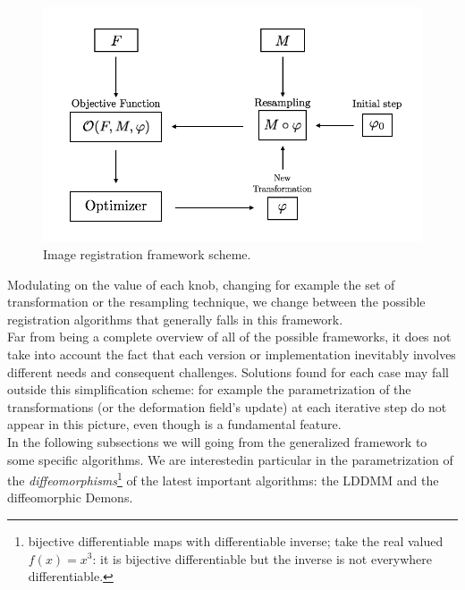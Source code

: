 \begin{figure}[!ht]
	\centering
	\includegraphics[scale=0.35]{figures/iterative_algorithm.png}
	\caption{Image registration framework scheme.}
	\label{fig:iterative_algorithm_scheme}
\end{figure}

\noindent
Modulating on the value of each knob, changing for example the set of transformation or the resampling technique, we change between the possible registration algorithms that generally falls in this framework.\\

%
\noindent
Far from being a complete overview of all of the possible frameworks, it does not take into account the fact that each version or implementation inevitably involves different needs and consequent challenges. Solutions found for each case may fall outside this simplification scheme: for example the parametrization of the transformations (or the deformation field's update) at each iterative step do not appear in this picture, even though is a fundamental feature. \\
In the following subsections we will going from the generalized framework to some specific algorithms. We are interestedin particular in the parametrization of the \emph{diffeomorphisms}\footnote{bijective differentiable maps with differentiable inverse; take the real valued $f(x)=x^3$: it is bijective differentiable but the inverse is not everywhere differentiable.} of the latest important algorithms: the LDDMM and the diffeomorphic Demons.

